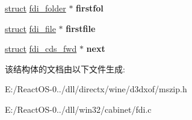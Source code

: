 \begin{DoxyCompactItemize}
\item 
\mbox{\label{structfdi__cds__fwd_aa9fe0dfa628aae7f8933cd018435efda}} 
\hyperlink{interfacestruct}{struct} \hyperlink{structfdi__folder}{fdi\+\_\+folder} $\ast$ {\bfseries firstfol}
\item 
\mbox{\label{structfdi__cds__fwd_ad62138a0ae30a4ba156fbd8daba21ac9}} 
\hyperlink{interfacestruct}{struct} \hyperlink{structfdi__file}{fdi\+\_\+file} $\ast$ {\bfseries firstfile}
\item 
\mbox{\label{structfdi__cds__fwd_a6e5098b4da445f8c7a25290968028220}} 
\hyperlink{interfacestruct}{struct} \hyperlink{structfdi__cds__fwd}{fdi\+\_\+cds\+\_\+fwd} $\ast$ {\bfseries next}
\end{DoxyCompactItemize}


该结构体的文档由以下文件生成\+:\begin{DoxyCompactItemize}
\item 
E\+:/\+React\+O\+S-\/0../dll/directx/wine/d3dxof/mszip.\+h\item 
E\+:/\+React\+O\+S-\/0../dll/win32/cabinet/fdi.\+c\end{DoxyCompactItemize}
